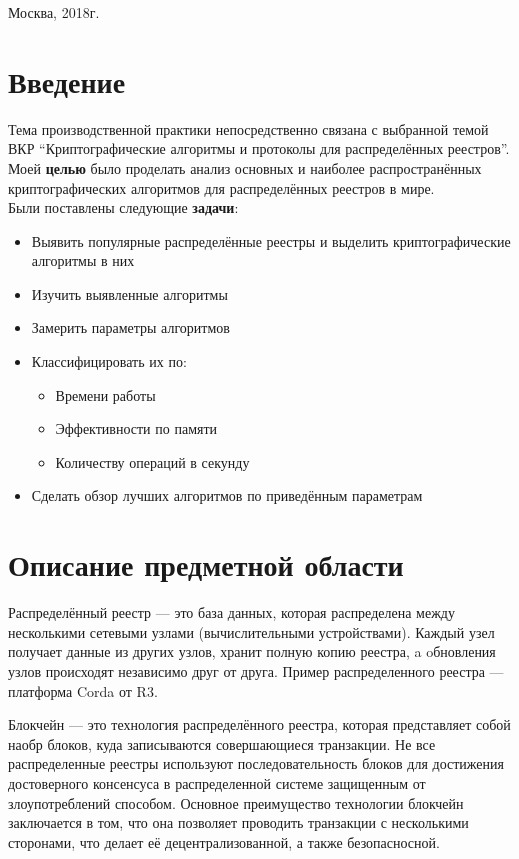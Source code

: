 \documentclass[russian, a4paper, 12pt]{article}
\newcommand\tab[1][1cm]{\hspace*{#1}}
\begin{document}
\begin{center}
	Москва, 2018г.
\end{center}
\newpage
\tableofcontents
\newpage

\section{Введение}
\tab[0.74cm] Тема производственной практики непосредственно связана с выбранной темой ВКР ``Криптографические алгоритмы и протоколы для распределённых реестров''.\\

Моей \textbf{целью} было проделать анализ основных и наиболее распространённых криптографических алгоритмов для распределённых реестров в мире.\\
\newline
Были  поставлены следующие \textbf{задачи}:
\begin{itemize}
	\item Выявить популярные распределённые реестры и выделить криптографические алгоритмы в них
	\item Изучить выявленные алгоритмы
    \item Замерить параметры алгоритмов
	\item Классифицировать их по:
        \begin{itemize}
            \item Времени работы
            \item Эффективности по памяти
            \item Количеству операций в секунду
        \end{itemize}
    \item Сделать обзор лучших алгоритмов по приведённым параметрам
\end{itemize}

\newpage
\section{Описание предметной области}

Распределённый реестр --- это база данных, которая распределена между
несколькими сетевыми узлами (вычислительными устройствами). Каждый узел
получает данные из других узлов, хранит полную копию реестра, a oбновления узлов
происходят независимо друг от друга. Пример распределенного реестра --- платформа Corda от R3.

Блокчейн --- это технология распределённого реестра, которая представляет собой
наобр блоков, куда записываются совершающиеся транзакции. Не все распределенные
реестры используют последовательность блоков для достижения достоверного
консенсуса в распределенной системе защищенным от злоупотреблений способом.
Основное преимущество технологии блокчейн заключается в том, что она позволяет
проводить транзакции с несколькими сторонами, что делает её децентрализованной,
а также безопасносной.
\end{document}

